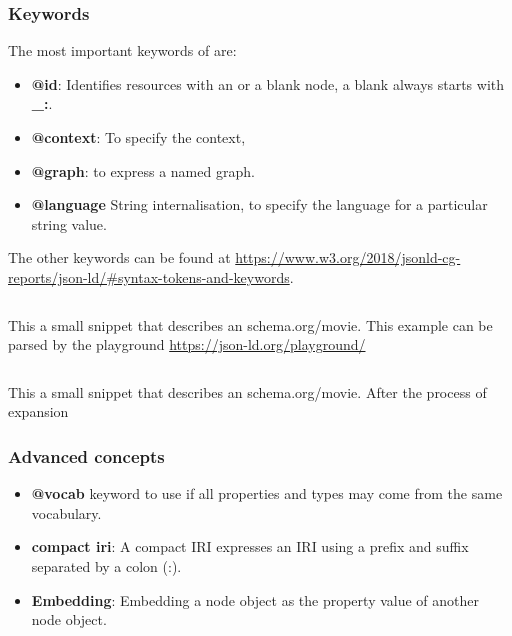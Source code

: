 \subsubsection{Keywords}
The most important keywords of  are:
\begin{itemize}
    \item \textbf{@id}: Identifies resources with an  or a blank node, a blank always starts with \textbf{\_:}.
    \item \textbf{@context}: To specify the context, 
    \item \textbf{@graph}: to express a named graph.
    \item \textbf{@language} String internalisation, to specify the language for a particular string value.
\end{itemize}
The other keywords can be found at \url{https://www.w3.org/2018/jsonld-cg-reports/json-ld/#syntax-tokens-and-keywords}.

\begin{listing}[H]
    \inputminted[linenos,frame=single]{JSON-LD}{code/shema_movie_example_sita_raman.jsonld}
    \caption{This a small  snippet that describes an schema.org/movie. This example can be parsed by the  playground \url{https://json-ld.org/playground/}}
    \label{code: example:jsonmovie}
\end{listing}

\begin{listing}[H]
    \inputminted[linenos,frame=single]{JSON-LD}{code/expanded_shema_movie.jsonld}
    \caption{This a small  snippet that describes an schema.org/movie. After the process of expansion}
    \label{code: example:jsonmovie:expanded}
\end{listing}

\subsubsection{Advanced concepts}
\begin{itemize}
    \item \textbf{@vocab} keyword to use if all properties and types may come from the same vocabulary.
    \item \textbf{compact iri}: A compact IRI expresses an IRI using a prefix and suffix separated by a colon (:).
    \item \textbf{Embedding}: Embedding a node object as the property value of another node object.
\end{itemize}


